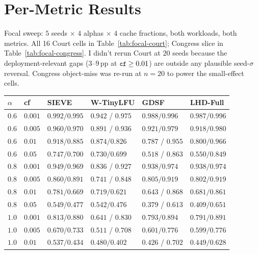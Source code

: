 \documentclass[letterpaper,twocolumn,10pt]{article}
\newcommand{\code}[1]{\texttt{\small #1}}
\begin{document}
\section{Per-Metric Results}\label{sec:gdsf}
Focal sweep: $5$ seeds $\times$ $4$ alphas $\times$ $4$ cache fractions,
both workloads, both metrics. All 16 Court cells in
Table~\ref{tab:focal-court}; Congress slice in
Table~\ref{tab:focal-congress}. I didn't rerun Court at $20$ seeds
because the deployment-relevant gaps ($3$--$9$\,pp at
$\code{cf} \geq 0.01$) are outside any plausible seed-$\sigma$
reversal. Congress object-miss was re-run at $n{=}20$ to power the
small-effect cells.
\begin{table}[t]
\centering
\footnotesize
\renewcommand{\arraystretch}{0.95}
\begin{tabularx}{\textwidth}{@{}llXXXX@{}}
\toprule
$\alpha$ & cf & SIEVE & W-TinyLFU & GDSF & LHD-Full \\
\midrule
$0.6$ & $0.001$ & $0.992 / 0.995$ & $\mathbf{0.942}$ / $\mathbf{0.975}$ & $0.988 / 0.996$ & $0.987 / 0.996$ \\
$0.6$ & $0.005$ & $0.960 / 0.970$ & $\mathbf{0.891}$ / $\mathbf{0.936}$ & $0.921 / 0.979$ & $0.918 / 0.980$ \\
$0.6$ & $0.01$  & $0.918 / 0.885$ & $0.874 / \mathbf{0.826}$            & $\mathbf{0.787}$ / $0.955$ & $0.800 / 0.966$ \\
$0.6$ & $0.05$  & $0.747 / 0.700$ & $0.730 / \mathbf{0.699}$            & $\mathbf{0.518}$ / $0.863$ & $0.550 / 0.849$ \\
$0.8$ & $0.001$ & $0.949 / 0.969$ & $\mathbf{0.836}$ / $\mathbf{0.927}$ & $0.938 / 0.974$ & $0.938 / 0.974$ \\
$0.8$ & $0.005$ & $0.860 / 0.891$ & $\mathbf{0.741}$ / $\mathbf{0.848}$ & $0.805 / 0.919$ & $0.802 / 0.919$ \\
$0.8$ & $0.01$  & $0.781 / 0.669$ & $0.719 / \mathbf{0.621}$            & $\mathbf{0.643}$ / $0.868$ & $0.681 / 0.861$ \\
$0.8$ & $0.05$  & $0.549 / 0.477$ & $0.542 / \mathbf{0.476}$            & $\mathbf{0.379}$ / $0.613$ & $0.409 / 0.651$ \\
$1.0$ & $0.001$ & $0.813 / 0.880$ & $\mathbf{0.641}$ / $\mathbf{0.830}$ & $0.793 / 0.894$ & $0.791 / 0.891$ \\
$1.0$ & $0.005$ & $0.670 / 0.733$ & $\mathbf{0.511}$ / $\mathbf{0.708}$ & $0.601 / 0.776$ & $0.599 / 0.776$ \\
$1.0$ & $0.01$  & $0.537 / 0.434$ & $0.480 / \mathbf{0.402}$            & $\mathbf{0.426}$ / $0.702$ & $0.449 / 0.628$ \\

\end{tabularx}
\end{table}
\end{document}
